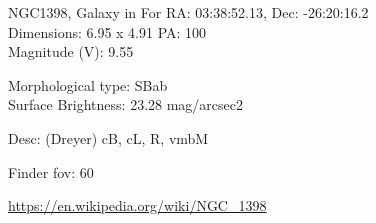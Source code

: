 \begin{block}{NGC1398, Galaxy in For}
    RA: 03:38:52.13, Dec: -26:20:16.2 \\ 
    Dimensions: 6.95 x 4.91 PA: 100 \\ 
    Magnitude (V): 9.55

    Morphological type: SBab \\ 
    Surface Brightness: 23.28 mag/arcsec2 

    Desc: (Dreyer) cB, cL, R, vmbM 

    Finder fov: 60 

    \url{https://en.wikipedia.org/wiki/NGC_1398} 
\end{block}